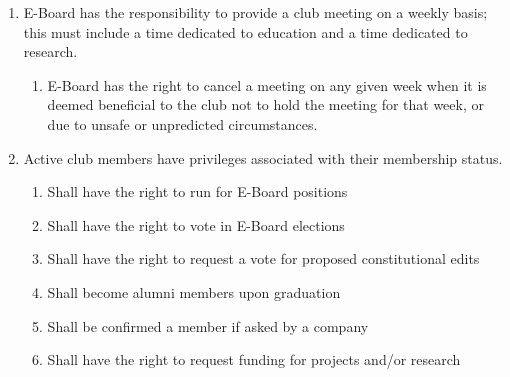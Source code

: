 

\begin{enumerate}
  \item E-Board has the responsibility to provide a club meeting on a weekly
    basis; this must include a time dedicated to education and a time dedicated
    to research.
  \begin{enumerate}
    \item E-Board has the right to cancel a meeting on any given
      week when it is deemed beneficial to the club not to hold the meeting for
      that week, or due to unsafe or unpredicted circumstances.
  \end{enumerate}
  \item Active club members have privileges associated with their
    membership status.
  \begin{enumerate}
    \item Shall have the right to run for E-Board positions
    \item Shall have the right to vote in E-Board elections
    \item Shall have the right to request a vote for proposed constitutional edits 
    \item Shall become alumni members upon graduation
    \item Shall be confirmed a member if asked by a company
    \item Shall have the right to request funding for projects and/or research
  \end{enumerate}
\end{enumerate}
